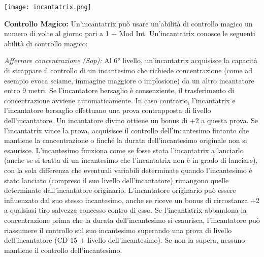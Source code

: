 \documentclass[a4paper]{report}
\begin{document}
\begin{multicols}{2}
\texttt{[image: incantatrix.png]}

\textbf{Controllo Magico:} Un'incantatrix può usare un'abilità di controllo magico un numero di volte al giorno pari a 1 + Mod Int. Un'incantatrix conosce le seguenti abilità di controllo magico:

\textit{Afferrare concentrazione (Sop):} Al 6° livello, un'incantatrix acquisisce la capacità di strappare il controllo di un incantesimo che richiede concentrazione (come ad esempio evoca sciame, immagine maggiore o implosione) da un altro incantatore entro 9 metri. Se l'incantatore bersaglio è consenziente, il trasferimento di concentrazione avviene automaticamente. In caso contrario, l'incantatrix e l'incantatore bersaglio effettuano una prova contrapposta di livello dell'incantatore. Un incantatore divino ottiene un bonus di +2 a questa prova. Se l'incantatrix vince la prova, acquisisce il controllo dell'incantesimo fintanto che mantiene la concentrazione o finché la durata dell'incantesimo originale non si esaurisce. L'incantesimo funziona come se fosse stata l'incantatrix a lanciarlo (anche se si tratta di un incantesimo che l'incantatrix non è in grado di lanciare), con la sola differenza che eventuali variabili determinate quando l'incantesimo è stato lanciato (compreso il suo livello dell'incantatore) rimangono quelle determinate dall'incantatore originario. L'incantatore originario può essere influenzato dal suo stesso incantesimo, anche se riceve un bonus di circostanza +2 a qualsiasi tiro salvezza concesso contro di esso. Se l'incantatrix abbandona la concentrazione prima che la durata dell'incantesimo si esaurisca, l'incantatore può riassumere il controllo sul suo incantesimo superando una prova di livello dell'incantatore (CD 15 + livello dell'incantesimo). Se non la supera, nessuno mantiene il controllo dell'incantesimo.


\end{multicols}
\end{document}
